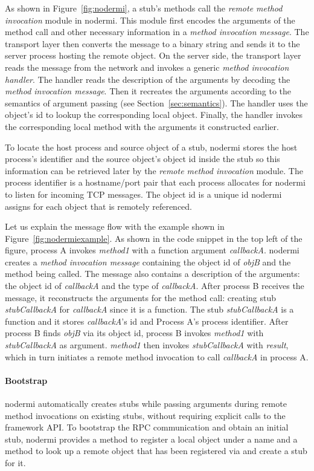 \nodermifig{}

As shown in Figure~\ref{fig:nodermi}, a stub's methods call the
\emph{remote method invocation} module in nodermi.
This module first encodes the arguments of the method call
 and other necessary information
in a \emph{method invocation message}.
The transport layer then converts the message to
a binary string and sends it
to the server process hosting the remote object.
On the server side, the transport layer reads
the message from the network and invokes a generic
\emph{method invocation handler}.
The handler reads the description of the arguments
by decoding the \emph{method invocation message}.
Then it recreates the arguments according to
the semantics of argument passing (see Section~\ref{sec:semantics}).
The handler uses the object's id to lookup the corresponding local object.
Finally, the handler invokes the corresponding local method
with the arguments it constructed earlier.

To locate the host process and source object of a stub,
nodermi stores the host process's identifier and the source object's object id
inside the stub so this information can be retrieved later by
the \emph{remote method invocation} module.
The process identifier is a hostname/port pair that each process
allocates for nodermi to listen for incoming TCP messages.
The object id is a unique id nodermi assigns for each object that
is remotely referenced.

Let us explain the message flow with the example shown in Figure~\ref{fig:nodermiexample}.
As shown in the code snippet in the top left of the figure,
process A invokes \emph{method1} with a function argument \emph{callbackA}.
nodermi creates a \emph{method invocation message}
containing the object id of \emph{objB} and the method being called.
The message also contains a description of the arguments:
the object id of \emph{callbackA} and
the type of \emph{callbackA}.
After process B receives the message,
it reconstructs the arguments for the method call:
creating stub \emph{stubCallbackA} for \emph{callbackA} since it is a function.
The stub \emph{stubCallbackA} is a function and
it stores \emph{callbackA}'s id and Process A's process identifier.
After process B finds \emph{objB} via its object id,
process B invokes \emph{method1} with \emph{stubCallbackA} as argument.
\emph{method1} then invokes \emph{stubCallbackA} with \emph{result},
which in turn initiates a remote method invocation
to call \emph{callbackA} in process A.


\paragraph{Bootstrap}
nodermi automatically creates stubs while passing arguments during remote method invocations
on existing stubs, without requiring explicit calls to the framework API.
To bootstrap the RPC communication and obtain an initial stub,
nodermi provides a  method to register a local object
under a name and a  method to look up a remote object that
has been registered via  and create a stub for it.

